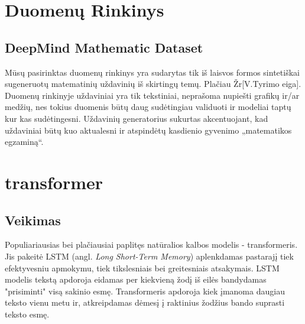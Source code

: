 \documentclass[conference]{IEEEtran}
\begin{document}
\section{Duomenų Rinkinys}

\subsection{DeepMind Mathematic Dataset}

Mūsų pasirinktas duomenų rinkinys yra sudarytas tik iš laisvos formos sintetiškai sugeneruotų matematinių uždavinių iš skirtingų temų. Plačiau Žr[V.Tyrimo eiga]. Duomenų rinkinyje uždaviniai yra tik tekstiniai, neprašoma nupiešti grafikų ir/ar medžių, nes tokius duomenis būtų daug sudėtingiau validuoti ir modeliai taptų kur kas sudėtingesni. Uždavinių generatorius sukurtas akcentuojant, kad uždaviniai būtų kuo aktualesni ir atspindėtų kasdienio gyvenimo „matematikos egzaminą“.






\section{transformer}

\subsection{Veikimas}
Populiariausias bei plačiausiai paplitęs natūralios kalbos modelis - transformeris. Jis pakeitė LSTM (angl. \textit{Long Short-Term Memory}) aplenkdamas pastarajį tiek efektyvesniu apmokymu, tiek tikslesniais bei greitesniais atsakymais. LSTM modelis tekstą apdoroja eidamas per kiekvieną žodį iš eilės bandydamas "prisiminti" visą sakinio esmę. Transformeris apdoroja kiek įmanoma daugiau teksto vienu metu ir, atkreipdamas dėmesį į raktinius žodžius bando suprasti teksto esmę.
\end{document}
